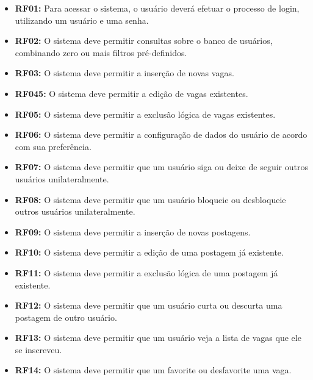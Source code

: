 \begin{itemize}
    \item \textbf{RF01:} Para acessar o sistema, o usuário deverá efetuar o processo de login, utilizando um usuário e uma senha.
    
    \item \textbf{RF02:} O sistema deve permitir consultas sobre o banco de usuários, combinando zero ou mais filtros pré-definidos.
    
    \item \textbf{RF03:} O sistema deve permitir a inserção de novas vagas.
    
    \item \textbf{RF045:} O sistema deve permitir a edição de vagas existentes.
    
    \item \textbf{RF05:} O sistema deve permitir a exclusão lógica de vagas existentes.
    
    \item \textbf{RF06:} O sistema deve permitir a configuração de dados do usuário de acordo com sua preferência.
    
    \item \textbf{RF07:} O sistema deve permitir que um usuário siga ou deixe de seguir outros usuários unilateralmente.
    
    \item \textbf{RF08:} O sistema deve permitir que um usuário bloqueie ou desbloqueie outros usuários unilateralmente.
    
    \item \textbf{RF09:} O sistema deve permitir a inserção de novas postagens.
    
    \item \textbf{RF10:} O sistema deve permitir a edição de uma postagem já existente.
    
    \item \textbf{RF11:} O sistema deve permitir a exclusão lógica de uma postagem já existente.
    
    \item \textbf{RF12:} O sistema deve permitir que um usuário curta ou descurta uma postagem de outro usuário. 
    
    \item \textbf{RF13:} O sistema deve permitir que um usuário veja a lista de vagas que ele se inscreveu.
    
    \item \textbf{RF14:} O sistema deve permitir que um favorite ou desfavorite uma vaga.
\end{itemize}

